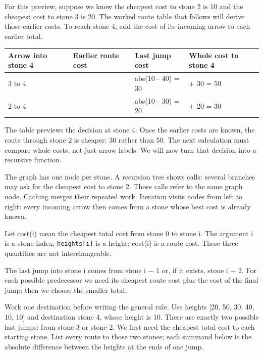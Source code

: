 \documentclass[11pt,a4paper,oneside]{report}
\begin{document}
For this preview, suppose we know the cheapest cost to stone 2 is 10 and the cheapest cost to stone 3 is 20. The worked route table that follows will derive those earlier costs. To reach stone 4, add the cost of its incoming arrow to each earlier total.

\par\medskip\begingroup\small\setlength{\tabcolsep}{4pt}\renewcommand{\arraystretch}{1.3}\begin{tabularx}{\linewidth}{>{\raggedright\arraybackslash}X>{\raggedright\arraybackslash}X>{\raggedright\arraybackslash}X>{\raggedright\arraybackslash}X}\toprule\textbf{Arrow into stone 4} & \textbf{Earlier route cost} & \textbf{Last jump cost} & \textbf{Whole cost to stone 4}\\\midrule
{}3 to 4 & 20 & abs(10 - 40) = 30 & 20 + 30 = 50\\
{}2 to 4 & 10 & abs(10 - 30) = 20 & 10 + 20 = 30\\
\bottomrule\end{tabularx}\endgroup\par\medskip
The table previews the decision at stone 4. Once the earlier costs are known, the route through stone 2 is cheaper: 30 rather than 50. The next calculation must compare whole costs, not just arrow labels. We will now turn that decision into a recursive function.

The graph has one node per stone. A recursion tree shows calls: several branches may ask for the cheapest cost to stone 2. Those calls refer to the same graph node. Caching merges their repeated work. Iteration visits nodes from left to right: every incoming arrow then comes from a stone whose best cost is already known.

Let cost(i) mean the cheapest total cost from stone 0 to stone i. The argument i is a stone index; \texttt{heights[i]} is a height; cost(i) is a route cost. These three quantities are not interchangeable.

The last jump into stone i comes from stone i − 1 or, if it exists, stone i − 2. For each possible predecessor we need its cheapest route cost plus the cost of the final jump; then we choose the smaller total:

Work one destination before writing the general rule. Use heights [20, 50, 30, 40, 10, 10] and destination stone 4, whose height is 10. There are exactly two possible last jumps: from stone 3 or stone 2. We first need the cheapest total cost to each starting stone. List every route to those two stones; each summand below is the absolute difference between the heights at the ends of one jump.
\end{document}
